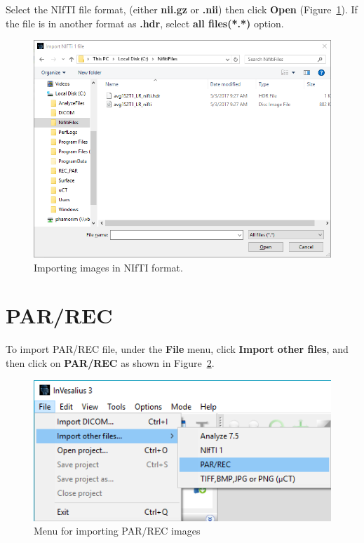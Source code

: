 Select the NIfTI file format, (either \textbf{nii.gz} or \textbf{.nii}) then click \textbf{Open} (Figure~\ref{fig:import_nifti_window_pt}). If the file is in another format as \textbf{.hdr}, select \textbf{all files(*.*)} option.

\begin{figure}[!htb]
\centering
\includegraphics[scale=0.4]{../user_guide_figures/invesalius_screen/import_nifti_window_en.png}
\caption{Importing images in NIfTI format.}
\label{fig:import_nifti_window_pt}
\end{figure}

\section{PAR/REC}

To import PAR/REC file, under the \textbf{File} menu, click \textbf{Import other files}, and then click on \textbf{PAR/REC} as shown in Figure~\ref{fig:import_parrec_menu_pt}.

\begin{figure}[!htb]
\centering
\includegraphics[scale=0.4]{../user_guide_figures/invesalius_screen/import_parrec_menu_en.png}
\caption{Menu for importing PAR/REC images}
\label{fig:import_parrec_menu_pt}
\end{figure}

